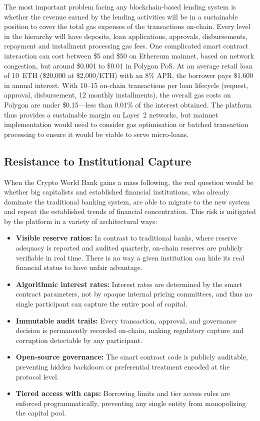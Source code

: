 \documentclass[12pt,a4paper]{report}
\begin{document}
The most important problem facing any blockchain-based lending system is whether the revenue earned by the lending activities will be in a sustainable position to cover the total gas expenses of the transactions on-chain. Every level in the hierarchy will have deposits, loan applications, approvals, disbursements, repayment and installment processing gas fees. One complicated smart contract interaction can cost between \$5 and \$50 on Ethereum mainnet, based on network congestion, but around \$0.001 to \$0.01 in Polygon PoS. At an average retail loan of 10~ETH (\$20,000 at \$2,000/ETH) with an 8\% APR, the borrower pays \$1,600 in annual interest. With 10--15 on-chain transactions per loan lifecycle (request, approval, disbursement, 12 monthly installments), the overall gas costs on Polygon are under \$0.15---less than 0.01\% of the interest obtained. The platform thus provides a sustainable margin on Layer~2 networks, but mainnet implementation would need to consider gas optimisation or batched transaction processing to ensure it would be viable to serve micro-loans.

\subsection{Resistance to Institutional Capture}

When the Crypto World Bank gains a mass following, the real question would be whether big capitalists and established financial institutions, who already dominate the traditional banking system, are able to migrate to the new system and repeat the established trends of financial concentration. This risk is mitigated by the platform in a variety of architectural ways:

\begin{itemize}[noitemsep]
\item \textbf{Visible reserve ratios:} In contrast to traditional banks, where reserve adequacy is reported and audited quarterly, on-chain reserves are publicly verifiable in real time. There is no way a given institution can hide its real financial status to have unfair advantage.
\item \textbf{Algorithmic interest rates:} Interest rates are determined by the smart contract parameters, not by opaque internal pricing committees, and thus no single participant can capture the entire pool of capital.
\item \textbf{Immutable audit trails:} Every transaction, approval, and governance decision is permanently recorded on-chain, making regulatory capture and corruption detectable by any participant.
\item \textbf{Open-source governance:} The smart contract code is publicly auditable, preventing hidden backdoors or preferential treatment encoded at the protocol level.
\item \textbf{Tiered access with caps:} Borrowing limits and tier access rules are enforced programmatically, preventing any single entity from monopolizing the capital pool.
\end{itemize}
\end{document}
